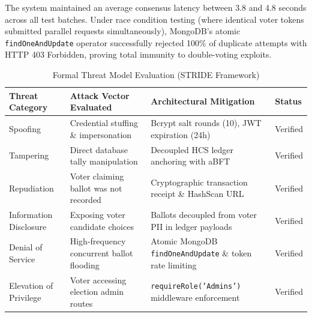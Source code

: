 \documentclass[12pt, a4paper]{article}
\begin{document}
The system maintained an average consensus latency between 3.8 and 4.8 seconds across all test batches. Under race condition testing (where identical voter tokens submitted parallel requests simultaneously), MongoDB's atomic \texttt{findOneAndUpdate} operator successfully rejected 100\% of duplicate attempts with HTTP 403 Forbidden, proving total immunity to double-voting exploits.

\begin{table}[H]
    \centering
    \caption{Formal Threat Model Evaluation (STRIDE Framework)}
    \label{tab:stride}
    \begin{tabularx}{\textwidth}{@{}l X X l@{}}
        \toprule
        \textbf{Threat Category} & \textbf{Attack Vector Evaluated} & \textbf{Architectural Mitigation} & \textbf{Status} \\
        \midrule
        Spoofing & Credential stuffing \& impersonation & Bcrypt salt rounds (10), JWT expiration (24h) & Verified \\
        Tampering & Direct database tally manipulation & Decoupled HCS ledger anchoring with aBFT & Verified \\
        Repudiation & Voter claiming ballot was not recorded & Cryptographic transaction receipt \& HashScan URL & Verified \\
        Information Disclosure & Exposing voter candidate choices & Ballots decoupled from voter PII in ledger payloads & Verified \\
        Denial of Service & High-frequency concurrent ballot flooding & Atomic MongoDB \texttt{findOneAndUpdate} \& token rate limiting & Verified \\
        Elevation of Privilege & Voter accessing election admin routes & \texttt{requireRole('Admins')} middleware enforcement & Verified \\
        \bottomrule
    \end{tabularx}
\end{table}
\end{document}
